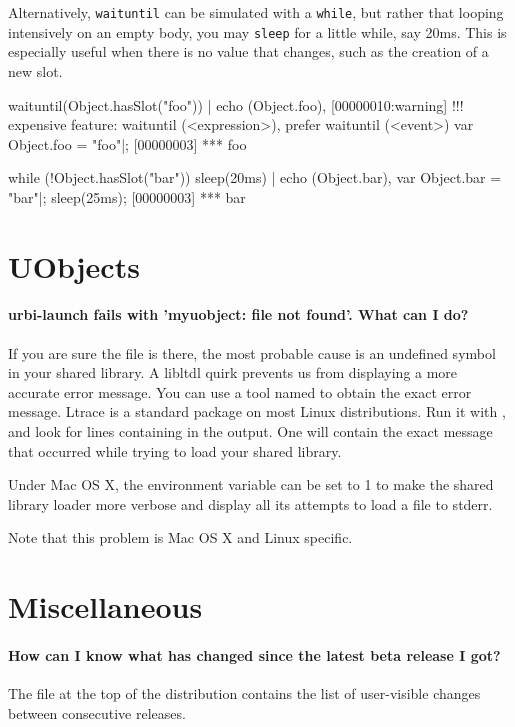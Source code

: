 Alternatively, \lstinline|waituntil| can be simulated with a
\lstinline|while|, but rather that looping intensively on an empty
body, you may \lstinline|sleep| for a little while, say 20ms.  This is
especially useful when there is no value that changes, such as the
creation of a new slot.

\begin{urbiscript}[firstnumber=last]
waituntil(Object.hasSlot("foo")) | echo (Object.foo),
[00000010:warning] !!! expensive feature: waituntil (<expression>), prefer waituntil (<event>)
var Object.foo = "foo"|;
[00000003] *** foo
\end{urbiscript}

\begin{urbiscript}[firstnumber=last]
while (!Object.hasSlot("bar")) sleep(20ms) | echo (Object.bar),
var Object.bar = "bar"|;
sleep(25ms);
[00000003] *** bar
\end{urbiscript}

\section{UObjects}

\paragraph{urbi-launch fails with 'myuobject: file not found'. What can I do?}
If you are sure the file is there, the most probable cause is an
undefined symbol in your shared library. A libltdl quirk prevents us
from displaying a more accurate error message.  You can use a tool
named  to obtain the exact error message.  Ltrace is a
standard package on most Linux distributions.  Run it with
, and look for lines
containing  in the output. One will contain the exact
message that occurred while trying to load your shared library.

Under Mac OS X, the  environment variable can
be set to 1 to make the shared library loader more verbose and display
all its attempts to load a file to stderr.

Note that this problem is Mac OS X and Linux specific.

\section{Miscellaneous}
\paragraph{How can I know what has changed since the latest beta release I got?}
The file  at the top of the distribution
contains the list of user-visible changes between consecutive
releases.

